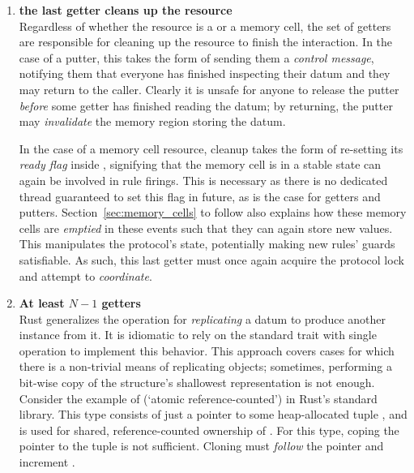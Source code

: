 \begin{enumerate}
	\item \textbf{the last getter cleans up the resource}\\
	Regardless of whether the resource is a  or a memory cell, the set of getters are responsible for cleaning up the resource to finish the interaction. In the case of a putter, this takes the form of sending them a \textit{control message}, notifying them that everyone has finished inspecting their datum and they may return to the caller. Clearly it is unsafe for anyone to release the putter \textit{before} some getter has finished reading the datum; by returning, the putter may \textit{invalidate} the memory region storing the datum.
	
	In the case of a memory cell resource, cleanup takes the form of re-setting its \textit{ready flag} inside , signifying that the memory cell is in a stable state can again be involved in rule firings. This is necessary as there is no dedicated thread guaranteed to set this flag in future, as is the case for getters and putters. Section~\ref{sec:memory_cells} to follow also explains how these memory cells are \textit{emptied} in these events such that they can again store new values. This manipulates the protocol's state, potentially making new rules' guards satisfiable. As such, this last getter must once again acquire the protocol lock and attempt to \textit{coordinate}.
	
	\item \textbf{At least $N-1$ getters }\\
	Rust generalizes the operation for \textit{replicating} a datum to produce another instance from it. It is idiomatic to rely on the standard trait  with single operation  to implement this behavior. This approach covers cases for which there is a non-trivial means of replicating objects; sometimes, performing a bit-wise copy of the structure's shallowest representation is not enough. Consider the example of  (`atomic reference-counted') in Rust's standard library. This type consists of just a pointer to some heap-allocated tuple , and is used for shared, reference-counted ownership of . For this type, coping the pointer to the tuple is not sufficient. Cloning must \textit{follow} the pointer and increment .
	

\end{enumerate}
